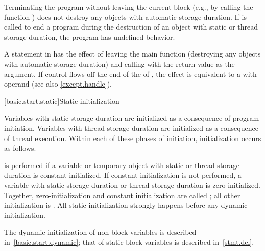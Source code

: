 \pnum
{}%
%
%
Terminating the program
without leaving the current block (e.g., by calling the function
) does not destroy any
objects with automatic storage duration. If
 is called to end a program during the destruction of
an object with static or thread storage duration, the program has undefined
behavior.

\pnum
{}%
%
A  statement in  has the effect of leaving the main
function (destroying any objects with automatic storage duration) and
calling  with the return value as the argument.
If control flows off the end of
the  of ,
the effect is equivalent to a  with operand 
(see also \ref{except.handle}).

[basic.start.static]{Static initialization}

\pnum
{}%
%
Variables with static storage duration
are initialized as a consequence of program initiation. Variables with
thread storage duration are initialized as a consequence of thread execution.
Within each of these phases of initiation, initialization occurs as follows.

\pnum
{}%
 is performed
if a variable or temporary object with static or thread storage duration
is constant-initialized.
%
If constant initialization is not performed, a variable with static
storage duration or thread storage
duration is zero-initialized.
Together, zero-initialization and constant initialization are called
;
all other initialization is .
All static initialization strongly happens before
any dynamic initialization.
\begin{note}
The dynamic initialization of non-block variables is described
in~\ref{basic.start.dynamic}; that of static block variables is described
in~\ref{stmt.dcl}.
\end{note}

